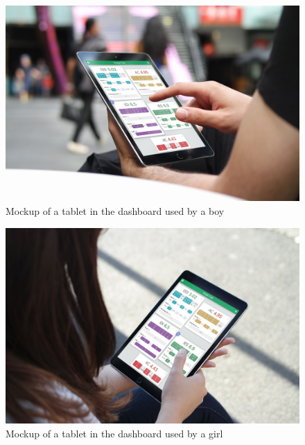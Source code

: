 \begin{figure}[ht!]
    \center
    \includegraphics[width=0.85\columnwidth]{media/mockups/mockup-tablet-boy.jpg}
    \caption{Mockup of a tablet in the dashboard used by a boy}
    \label{fig:mockup-phone-home}
\end{figure}
\vfill
\begin{figure}[ht!]
    \center
    \includegraphics[width=0.85\columnwidth]{media/mockups/mockup-tablet-girl.jpg}
    \caption{Mockup of a tablet in the dashboard used by a girl}
    \label{fig:mockup-phone-home}
\end{figure}

\clearpage\newpage

